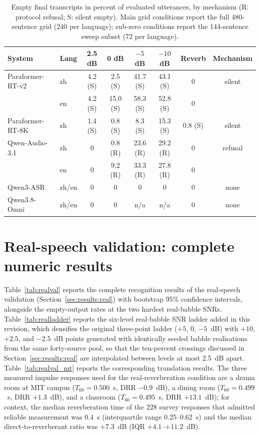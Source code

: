 \begin{table}[h]
\centering
\caption{Empty final transcripts in percent of evaluated utterances, by
mechanism (R: protocol refusal; S: silent empty). Main grid conditions
report the full 480-sentence grid (240 per language); sub-zero conditions
report the 144-sentence sweep subset (72 per language).}
\label{tab:refusal}
\footnotesize
\setlength{\tabcolsep}{2.3pt}
\begin{tabular}{llcccccc}
\toprule
System & Lang & 2.5 dB & 0 dB & $-5$ dB & $-10$ dB & Reverb & Mechanism \\
\midrule
Paraformer-RT-v2 & zh & 4.2 (S) & 2.5 (S) & 41.7 (S) & 43.1 (S) & 0 & silent \\
 & en & 4.2 (S) & 15.0 (S) & 58.3 (S) & 52.8 (S) & 0 & \\
Paraformer-RT-8K & zh & 1.4 (S) & 0.8 (S) & 8.3 (S) & 15.3 (S) & 0.8 (S) & silent \\
Qwen-Audio-3.1 & zh & 0 & 0.8 (R) & 23.6 (R) & 29.2 (R) & 0 & refusal \\
 & en & 0 & 9.2 (R) & 33.3 (R) & 27.8 (R) & 0 & \\
Qwen3-ASR & zh/en & 0 & 0 & 0 & 0 & 0 & none \\
Qwen3.8-Omni & zh/en & 0 & 0 & n/a & n/a & 0 & none \\
\bottomrule
\end{tabular}
\end{table}

\section{Real-speech validation: complete numeric results}
\label{app:real}

Table~\ref{tab:realval} reports the complete recognition results of the
real-speech validation (Section~\ref{sec:results:real}) with bootstrap 95\%
confidence intervals, alongside the empty-output rates at the two hardest
real-babble SNRs. Table~\ref{tab:realladder} reports the six-level
real-babble SNR ladder added in this revision, which densifies the
original three-point ladder ($+5$, $0$, $-5$~dB) with $+10$, $+2.5$, and
$-2.5$~dB points generated with identically seeded babble realisations
from the same forty-source pool, so that the ten-percent crossings
discussed in Section~\ref{sec:results:real} are interpolated between
levels at most 2.5~dB apart. Table~\ref{tab:realval_mt} reports the
corresponding
translation results. The three measured impulse responses used for the
real-reverberation condition are a drama room at MIT campus ($T_{60} =
0.500$~s, DRR $-0.9$~dB), a dining room ($T_{60} = 0.499$~s, DRR
$+1.3$~dB), and a classroom ($T_{60} = 0.495$~s, DRR $+13.1$~dB); for
context, the median reverberation time of the 228 survey responses that
admitted reliable measurement was 0.4~s (interquartile range 0.25--0.62~s)
and the median direct-to-reverberant ratio was $+7.3$~dB (IQR
$+4.1$--$+11.2$~dB).

